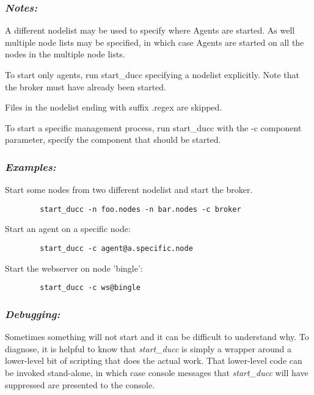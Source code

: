       \subsubsection{{\em Notes: }}
      A different nodelist may be used to specify where Agents are started. As well multiple node 
      lists may be specified, in which case Agents are started on all the nodes in the multiple node 
      lists. 
      
      To start only agents, run start\_ducc specifying a nodelist explicitly. Note that the broker
      must have already been started.
      
      Files in the nodelist ending with suffix .regex are skipped.
      
      To start a specific management process, run start\_ducc with the -c component parameter, 
      specify the component that should be started. 
      
      \subsubsection{{\em Examples: }}

      Start some nodes from two different nodelist and start the broker.  
\begin{verbatim}
        start_ducc -n foo.nodes -n bar.nodes -c broker
\end{verbatim}
                  
      Start an agent on a specific node: 
\begin{verbatim}
        start_ducc -c agent@a.specific.node 
\end{verbatim}
      
      Start the webserver on node 'bingle': 
\begin{verbatim}
        start_ducc -c ws@bingle 
\end{verbatim}

      \subsubsection{{\em Debugging:}}

      Sometimes something will not start and it can be difficult to understand why.  To diagnose, it is
      helpful to know that {\em start\_ducc} is simply a wrapper around a lower-level bit of scripting
      that does the actual work.  That lower-level code can be invoked stand-alone, in which case
      console messages that {\em start\_ducc} will have suppressed are presented to the console.

